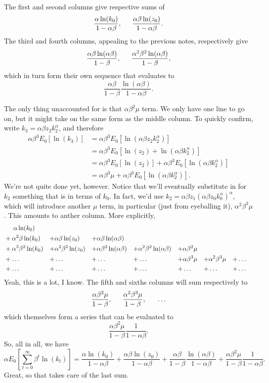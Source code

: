 \documentclass[12pt]{article}
\theoremstyle{definition}
\begin{document}
The first and second columns give respective sums of
	\[ \frac{\alpha \ln(k_0)}{1 - \alpha \beta } , \indent \frac{\alpha \beta \ln(z_0)}{1 - \alpha \beta }.	\]
The third and fourth columns, appealing to the previous notes, respectively give
	\[ \frac{\alpha \beta \ln(\alpha \beta)}{1 - \beta}, \indent  \frac{\alpha^2 \beta^2 \ln(\alpha \beta)}{1 - \beta}, \]
which in turn form their own sequence that evaluates to
	\[ \frac{\alpha \beta}{1 - \beta}\frac{\ln(\alpha \beta)}{1 - \alpha \beta}.	\]

The only thing unaccounted for is that $\alpha \beta^2 \mu$ term. We only have one line to go on, but it might take on the same form as the middle column. To quickly confirm, write $k_3= \alpha \beta z_2k_2^{\alpha}$, and therefore
	\begin{align*}
		 \alpha \beta^3  E_0[\ln(k_3)] &=		 \alpha \beta^3  E_0[\ln(\alpha \beta z_2k_2^{\alpha})]\\
		 &= \alpha \beta^3 E_0[\ln(z_2) + \ln(\alpha \beta k_2^{\alpha})]\\
		 &= \alpha \beta^3 E_0[\ln(z_2)]+  \alpha \beta^3 E_0[\ln(\alpha \beta k_2^{\alpha})]\\
		 &= \alpha \beta^3 \mu + \alpha \beta^3 E_0[\ln(\alpha \beta k_2^{\alpha})].
	\end{align*}
We're not quite done yet, however. Notice that we'll eventually substitute in for $k_2$ something that is in terms of $k_0$. In fact, we'd use $k_2= \alpha \beta z_1(\alpha \beta z_0k_0^{\alpha})^{\alpha}$, which will introduce another $\mu$ term, in particular (just from eyeballing it), $\alpha^2 \beta^3 \mu$. This amounts to anther column. More explicitly,
\begin{align*}
	&\hspace{.5cm} \alpha \ln(k_0) \\
	&+\alpha^2 \beta \ln(k_0) &+& \alpha \beta \ln(z_0)  &+& \alpha \beta \ln(\alpha \beta)   \\
	&+\alpha^3 \beta^2 \ln(k_0) &+& \alpha^2 \beta^2\ln( z_0) &+& \alpha \beta^2 \ln( \alpha \beta) &+&  \alpha^2 \beta^2\ln(\alpha \beta) &+& \alpha \beta^2\mu \\
	&+ \hdots &+& \hdots &+& \hdots &+& \hdots &+&\alpha \beta^3 \mu &+& \alpha^2 \beta^3 \mu  &+& \hdots	 \\
	&+ \hdots &+& \hdots &+& \hdots &+& \hdots &+&\hdots &+& \hdots &+& \hdots
\end{align*}
Yeah, this is a lot, I know. The fifth and sixths columns will sum respectively to
	\[ \frac{\alpha \beta^2 \mu}{1 - \beta}, \indent \frac{\alpha^2 \beta^3 \mu}{1 - \beta},	\indent \hdots \]
which themselves form a series that can be evaluated to
	\[ \frac{\alpha \beta^2 \mu}{1 - \beta}\frac{1}{1 - \alpha \beta}.	\]
So, all in all, we have
	\[\alpha E_0 \left[ \sum_{t=0}^{\infty} \beta^t \ln(k_t) \right] =  \frac{\alpha \ln(k_0)}{1 - \alpha \beta} + \frac{\alpha \beta \ln(z_0)}{1 - \alpha \beta} + \frac{\alpha \beta}{1 - \beta} \frac{\ln(\alpha \beta)}{1 - \alpha \beta} + \frac{\alpha \beta^2 \mu}{1 - \beta}\frac{1}{1 - \alpha \beta}. \]
Great, so that takes care of the last sum.
\end{document}
